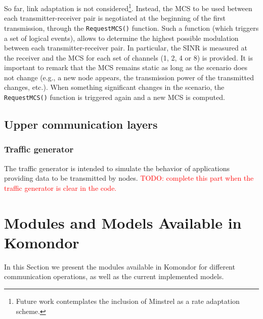 \documentclass[a4paper]{article}
\begin{document}
	So far, link adaptation is not considered\footnote{Future work contemplates the inclusion of Minstrel as a rate adaptation scheme.}. Instead, the MCS to be used between each transmitter-receiver pair is negotiated at the beginning of the first transmission, through the \texttt{RequestMCS()} function. Such a function (which triggers a set of logical events), allows to determine the highest possible modulation between each transmitter-receiver pair. In particular, the SINR is measured at the receiver and the MCS for each set of channels (1, 2, 4 or 8) is provided. It is important to remark that the MCS remains static as long as the scenario does not change (e.g., a new node appears, the transmission power of the transmitted changes, etc.). When something significant changes in the scenario, the \texttt{RequestMCS()} function is triggered again and a new MCS is computed.
	
\subsection{Upper communication layers}

	\subsubsection{Traffic generator}
	\label{section:traffic_generator}
	The traffic generator is intended to simulate the behavior of applications providing data to be transmitted by nodes. \textcolor{red}{TODO: complete this part when the traffic generator is clear in the code.}

\section{Modules and Models Available in Komondor}
\label{section:models}
In this Section we present the modules available in Komondor for different communication operations, as well as the current implemented models.
\end{document}
